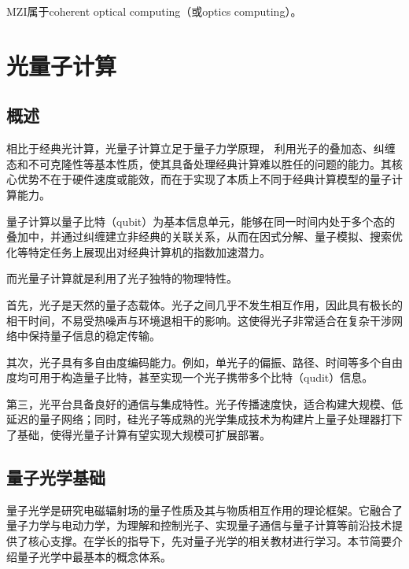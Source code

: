 \documentclass[hyperref, fntef, fancyhdr,zihao = -4,UTF8]{ctexart}
\begin{document}
MZI属于coherent optical computing（或optics computing）。

\section{光量子计算}

\subsection{概述}

相比于经典光计算，光量子计算立足于量子力学原理， 利用光子的叠加态、纠缠态和不可克隆性等基本性质，使其具备处理经典计算难以胜任的问题的能力。其核心优势不在于硬件速度或能效，而在于实现了本质上不同于经典计算模型的量子计算能力。

量子计算以量子比特（qubit）为基本信息单元，能够在同一时间内处于多个态的叠加中，并通过纠缠建立非经典的关联关系，从而在因式分解、量子模拟、搜索优化等特定任务上展现出对经典计算机的指数加速潜力。

而光量子计算就是利用了光子独特的物理特性。

首先，光子是天然的量子态载体。光子之间几乎不发生相互作用，因此具有极长的相干时间，不易受热噪声与环境退相干的影响。这使得光子非常适合在复杂干涉网络中保持量子信息的稳定传输。

其次，光子具有多自由度编码能力。例如，单光子的偏振、路径、时间等多个自由度均可用于构造量子比特，甚至实现一个光子携带多个比特（qudit）信息。

第三，光平台具备良好的通信与集成特性。光子传播速度快，适合构建大规模、低延迟的量子网络；同时，硅光子等成熟的光学集成技术为构建片上量子处理器打下了基础，使得光量子计算有望实现大规模可扩展部署。


\subsection{量子光学基础}

量子光学是研究电磁辐射场的量子性质及其与物质相互作用的理论框架。它融合了量子力学与电动力学，为理解和控制光子、实现量子通信与量子计算等前沿技术提供了核心支撑。在学长的指导下，先对量子光学的相关教材进行学习。本节简要介绍量子光学中最基本的概念体系。
\end{document}

